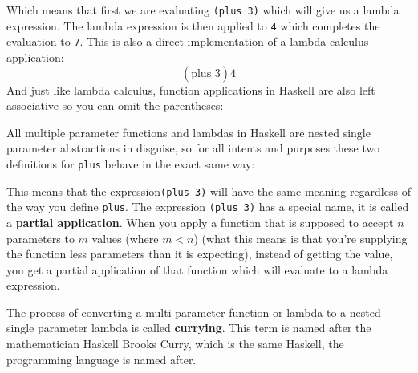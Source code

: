 Which means that first we are evaluating \texttt{(plus\ 3)} which will
give us a lambda expression. The lambda expression is then applied to
\texttt{4} which completes the evaluation to \texttt{7}. This is also a
direct implementation of a lambda calculus application: \[
(\text{plus }\overline{3}) \overline 4
\] And just like lambda calculus, function applications in Haskell are
also left associative so you can omit the parentheses:

\begin{Shaded}
\begin{Highlighting}[]
\OperatorTok{\textgreater{}} 
\end{Highlighting}
\end{Shaded}

All multiple parameter functions and lambdas in Haskell are nested
single parameter abstractions in disguise, so for all intents and
purposes these two definitions for \texttt{plus} behave in the exact
same way:

\begin{Shaded}
\begin{Highlighting}[]
\OtherTok{=}\OperatorTok{+}
\end{Highlighting}
\end{Shaded}

\begin{Shaded}
\begin{Highlighting}[]
\OtherTok{=}\OtherTok{{-}\textgreater{}}\OtherTok{{-}\textgreater{}}\OperatorTok{+}
\end{Highlighting}
\end{Shaded}

This means that the expression\texttt{(plus\ 3)} will have the same
meaning regardless of the way you define \texttt{plus}. The expression
\texttt{(plus\ 3)} has a special name, it is called a \textbf{partial
application}. When you apply a function that is supposed to accept \(n\)
parameters to \(m\) values (where \(m<n\)) (what this means is that
you're supplying the function less parameters than it is expecting),
instead of getting the value, you get a partial application of that
function which will evaluate to a lambda expression.

The process of converting a multi parameter function or lambda to a
nested single parameter lambda is called \textbf{currying}. This term is
named after the mathematician Haskell Brooks Curry, which is the same
Haskell, the programming language is named after.

